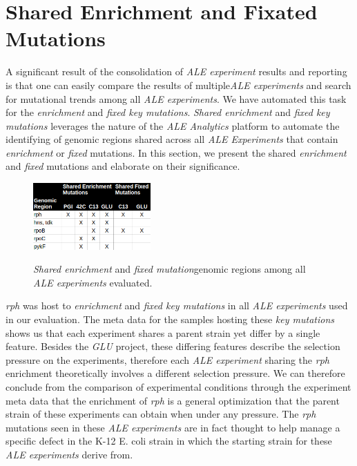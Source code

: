 \documentclass[12pt,final,masters,chapterheads]{ucsd}  %
\begin{document}
\section{Shared Enrichment and Fixated Mutations}
A significant result of the consolidation of \textit{ALE experiment} results and reporting is that one can easily compare the results of multiple\textit{ALE experiments} and search for mutational trends among all \textit{ALE experiments}. We have automated this task for the \textit{enrichment} and \textit{fixed key mutations}. \textit{Shared enrichment} and \textit{fixed key mutations} leverages the nature of the \textit{ALE Analytics} platform to automate the identifying of genomic regions shared across all \textit{ALE Experiments} that contain \textit{enrichment} or \textit{fixed} mutations. In this section, we present the shared \textit{enrichment} and \textit{fixed} mutations and elaborate on their significance.%
\begin{figure}[H]
  \caption{\textit{Shared enrichment} and \textit{fixed mutation}genomic regions among all \textit{ALE experiments} evaluated.}
  \centering
  \includegraphics[width=0.4\textwidth]{shared_enrichment_fixed_genomic_regions.png}
  \label{fig:shared_enrichment_fixed_genomic_regions}
\end{figure}
\textit{rph} was host to \textit{enrichment} and \textit{fixed key mutations} in all \textit{ALE experiments} used in our evaluation. The meta data for the samples hosting these \textit{key mutations} shows us that each experiment shares a parent strain yet differ by a single feature. Besides the \textit{GLU} project, these differing features describe the selection pressure on the experiments, therefore each \textit{ALE experiment} sharing the \textit{rph} enrichment theoretically involves a different selection pressure. We can therefore conclude from the comparison of experimental conditions through the experiment meta data that the enrichment of \textit{rph} is a general optimization that the parent strain of these experiments can obtain when under any pressure. The \textit{rph} mutations seen in these \textit{ALE experiments} are in fact thought to help manage a specific defect in the K-12 E. coli strain in which the starting strain for these \textit{ALE experiments} derive from\cite{Conrad2009}.
\end{document}
